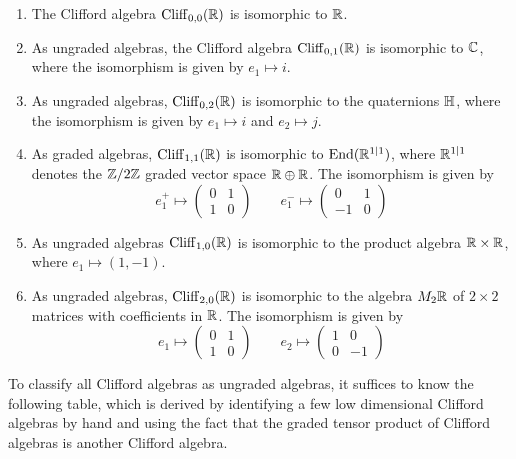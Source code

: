 \begin{exmp}\enumbreak
\begin{enumerate}
\item The Clifford algebra $\operatorname{Cliff}_{0,0}(\mathbb{R})$ is isomorphic to $\mathbb{R}$.
\item As ungraded algebras, the Clifford algebra $\operatorname{Cliff}_{0,1}(\mathbb{R})$ is isomorphic
      to $\mathbb{C}$, where the isomorphism is given by $e_1 \mapsto i$.
\item As ungraded algebras, $\operatorname{Cliff}_{0,2}(\mathbb{R})$ is isomorphic to the quaternions
      $\mathbb{H}$, where the isomorphism is given by $e_1 \mapsto i$ and $e_2 \mapsto j$.
\item As graded algebras, $\operatorname{Cliff}_{1,1}(\mathbb{R})$ is isomorphic to $\operatorname{End}(\mathbb{R}^{1|1})$,
      where $\mathbb{R}^{1|1}$ denotes the $\mathbb{Z}/2\mathbb{Z}$ graded vector space $\mathbb{R} \oplus \mathbb{R}$.
      The isomorphism is given by
      \[
       e_1^+ \mapsto \begin{pmatrix}
       0 & 1 \\
       1 & 0
       \end{pmatrix} \qquad e_1^- \mapsto \begin{pmatrix}
       0 & 1 \\
       -1 & 0
       \end{pmatrix}
      \]
\item As ungraded algebras $\operatorname{Cliff}_{1,0}(\mathbb{R})$ is isomorphic to the product
      algebra $\mathbb{R} \times \mathbb{R}$, where $e_1 \mapsto (1,-1)$.
\item As ungraded algebras, $\operatorname{Cliff}_{2,0}(\mathbb{R})$ is isomorphic to the algebra $M_2\mathbb{R}$
      of $2 \times 2$ matrices with coefficients in $\mathbb{R}$. The isomorphism is given by
      \[
       e_1 \mapsto \begin{pmatrix}
       0 & 1 \\
       1 & 0
       \end{pmatrix} \qquad e_2 \mapsto \begin{pmatrix}
       1 & 0 \\
       0 & -1
       \end{pmatrix}
      \]
      \qedhere\end{enumerate}
\end{exmp}
%
To classify all Clifford algebras as ungraded algebras, it suffices to know
the following table, which is derived by identifying a few low dimensional
Clifford algebras by hand and using the fact that the graded tensor product of
Clifford algebras is another Clifford algebra. \\\\
